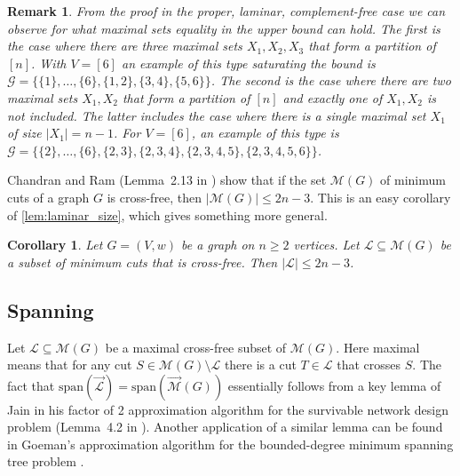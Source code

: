 \documentclass[10pt,a4paper]{article}
\newcommand{\Lcal}{\mathcal{L}}
\newcommand{\Mcal}{\mathcal{M}}
\newcommand{\M}{\mathcal{M}}
\newcommand{\Gcal}{\mathcal{G}}
\newcommand{\laspan}{\mathrm{span}}
\newcommand{\1}{\mathbf{1}}
\newtheorem{corollary}[theorem]{Corollary}
\newtheorem{remark}[theorem]{Remark}
\theoremstyle{definition}
\begin{document}
\begin{remark}
From the proof in the proper, laminar, complement-free case we can observe for what maximal sets equality in the upper bound can hold.  The first is the case where there are three maximal sets
$X_1, X_2, X_3$ that form a partition of $[n]$.  With $V=[6]$ an example of this type saturating the bound is
$\Gcal = \{ \{1\}, \ldots, \{6\}, \{1,2\}, \{3,4\}, \{5,6\} \}$.  The second is the case where there are two maximal sets $X_1,X_2$ that form a
partition of $[n]$ and exactly one of $X_1,X_2$ is not included.  The latter includes the case where there is a single maximal set $X_1$ of size $|X_1| = n-1$.
For $V=[6]$, an example of this type is $\Gcal = \{\{2\}, \ldots, \{6\}, \{2,3\},\{2,3,4\},\{2,3,4,5\},\{2,3,4,5,6\}\}$.
\end{remark}

Chandran and Ram (Lemma~2.13 in \cite{CR04}) show that if the set $\Mcal(G)$ of minimum cuts of a
graph $G$ is cross-free, then $|\Mcal (G)| \le 2n-3$.  This is an
easy corollary of \cref{lem:laminar_size}, which gives something more general.

\begin{corollary}
\label{cor:cross-free_size}
Let $G = (V,w)$ be a graph on $n \ge 2$ vertices.
Let $\Lcal \subseteq \Mcal(G)$ be a subset of minimum cuts that is cross-free.  Then
$|\Lcal| \le 2n-3$.
\end{corollary}

\subsection{Spanning}
Let $\Lcal \subseteq \Mcal(G)$ be a maximal cross-free subset of $\M(G)$.  Here maximal means that for any cut $S \in \M(G) \setminus \Lcal$ there
is a cut $T \in \Lcal$ that crosses $S$.  The fact that $\laspan(\vec{\Lcal}) = \laspan(\vec{\Mcal}(G))$
essentially follows from a key lemma of Jain in his factor of 2 approximation algorithm for the survivable network design problem (Lemma~4.2 in \cite{Jain01}).
Another application of a similar lemma can be found in Goeman's approximation algorithm for the bounded-degree minimum spanning tree problem \cite{Goemans06}.
\end{document}
